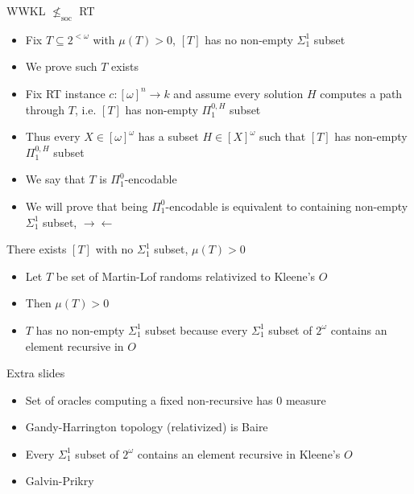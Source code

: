 \begin{frame}{WWKL $\nleq_{\text{soc}}$ RT}
  \begin{itemize}
    \item Fix $T\subseteq 2^{<\omega}$ with $\mu(T)>0$, $[T]$
      has no non-empty $\Sigma_1^1$ subset
    \item We prove such $T$ exists
    \item Fix RT instance $c:[\omega]^n\rightarrow k$ and assume every
      solution $H$ computes a path through $T$, i.e. $[T]$ has non-empty
      $\Pi_1^{0,H}$ subset
    \item Thus every $X\in[\omega]^\omega$ has a subset
      $H\in[X]^\omega$ such that $[T]$ has non-empty $\Pi_1^{0,H}$ subset
    \item We say that $T$ is $\Pi_1^0$-encodable
    \item We will prove that being $\Pi_1^0$-encodable is equivalent to
      containing non-empty $\Sigma_1^1$ subset, $\rightarrow\leftarrow$
  \end{itemize}
\end{frame}

\begin{frame}{There exists $[T]$ with no $\Sigma_1^1$ subset, $\mu(T)>0$}
  \begin{itemize}
    \item Let $T$ be set of Martin-Lof randoms relativized to Kleene's $O$
    \item Then $\mu(T)>0$
    \item $T$ has no non-empty $\Sigma_1^1$ subset because every
      $\Sigma_1^1$ subset of $2^\omega$ contains an element recursive in
      $O$
  \end{itemize}
\end{frame}

\begin{frame}{Extra slides}
  \begin{itemize}
    \item Set of oracles computing a fixed non-recursive has 0 measure
    \item Gandy-Harrington topology (relativized) is Baire
    \item Every $\Sigma_1^1$ subset of $2^\omega$ contains an element
      recursive in Kleene's $O$
    \item Galvin-Prikry
  \end{itemize}
\end{frame}
